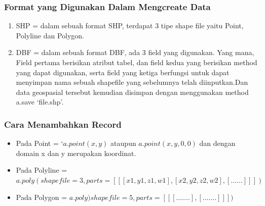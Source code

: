 \subsubsection{Format yang Digunakan Dalam Mengcreate Data}
\begin{enumerate}
     \item SHP = dalam sebuah format SHP, terdapat 3 tipe shape file yaitu Point, Polyline dan Polygon.
     \item DBF = dalam sebuah format DBF, ada 3 field yang digunakan. Yang mana, Field pertama  berisikan   atribut    tabel, dan                        field kedua yang berisikan method yang dapat digunakan, serta field yang ketiga berfungsi untuk dapat menyimpan                          nama sebuah shapefile yang sebelumnya telah diinputkan.Dan data geospasial tersebut kemudian disimpan dengan menggunakan method a.save ‘file.shp’.
\end{enumerate}

\subsubsection{Cara Menambahkan Record}
\begin{itemize}
    \item Pada Point = $‘a.point(x,y)$ ataupun $a.point(x,y,0,0)$ dan dengan domain x dan y merupakan koordinat.
    \item Pada Polyline = $a.poly(shapefile=3,parts=[[[x1,y1,z1,w1],[ x2,y2,z2,w2],[……]]])$
    \item Pada Polygon = $a.poly)shapefile=5,parts=[[[…….],[…….]]])$
\end{itemize}

